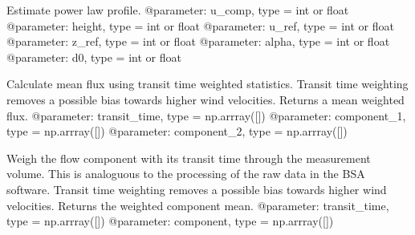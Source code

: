 \documentclass[letterpaper,10pt,english]{sphinxmanual}
\begin{document}

\begin{fulllineitems}
\label{\detokenize{index:windtunnel.power_law}}
Estimate power law profile.
@parameter: u\_comp, type = int or float
@parameter: height, type = int or float
@parameter: u\_ref, type = int or float
@parameter: z\_ref, type = int or float
@parameter: alpha, type = int or float
@parameter: d0, type = int or float

\end{fulllineitems}


\begin{fulllineitems}
\label{\detokenize{index:windtunnel.transit_time_weighted_flux}}
Calculate mean flux using transit time weighted statistics. Transit
time weighting removes a possible bias towards higher wind velocities.
Returns a mean weighted flux.
@parameter: transit\_time, type = np.arrray({[}{]})
@parameter: component\_1,  type = np.arrray({[}{]})
@parameter: component\_2,  type = np.arrray({[}{]})

\end{fulllineitems}


\begin{fulllineitems}
\label{\detokenize{index:windtunnel.transit_time_weighted_mean}}
Weigh the flow component with its transit time through the
measurement volume. This is analoguous to the processing of the raw
data in the BSA software. Transit time weighting removes a possible
bias towards higher wind velocities. Returns the weighted component mean.
@parameter: transit\_time, type = np.arrray({[}{]})
@parameter: component,  type = np.arrray({[}{]})

\end{fulllineitems}
\end{document}
